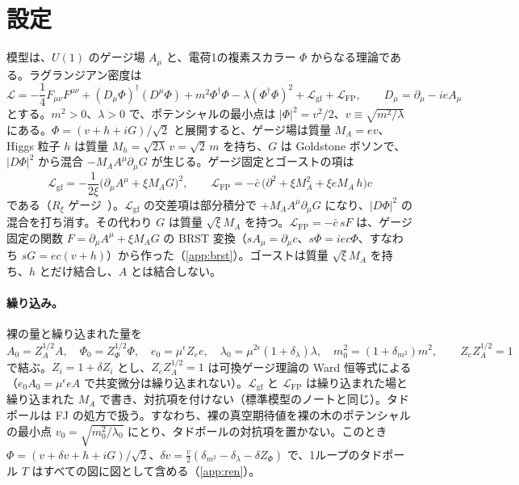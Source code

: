\documentclass[a4paper,10pt]{ltjsarticle}
\begin{document}
\section{設定}\label{sec:setup}

模型は、$U(1)$ のゲージ場 $A_\mu$ と、電荷1の複素スカラー $\Phi$ からなる理論である。ラグランジアン密度は
\begin{equation}
\mathcal L=-\frac14F_{\mu\nu}F^{\mu\nu}+(D_\mu\Phi)^\dagger(D^\mu\Phi)+m^2\Phi^\dagger\Phi-\lambda(\Phi^\dagger\Phi)^2+\mathcal L_{\mathrm{gf}}+\mathcal L_{\mathrm{FP}},\qquad
D_\mu=\partial_\mu-ieA_\mu
\label{eq:L}
\end{equation}
とする。$m^2>0$、$\lambda>0$ で、ポテンシャルの最小点は $|\Phi|^2=v^2/2$、$v\equiv\sqrt{m^2/\lambda}$ にある。$\Phi=(v+h+iG)/\sqrt2$ と展開すると、ゲージ場は質量 $M_A=ev$、Higgs 粒子 $h$ は質量 $M_h=\sqrt{2\lambda}\,v=\sqrt2\,m$ を持ち、$G$ は Goldstone ボソンで、$|D\Phi|^2$ から混合 $-M_AA^\mu\partial_\mu G$ が生じる。ゲージ固定とゴーストの項は
\begin{equation}
\mathcal L_{\mathrm{gf}}=-\frac1{2\xi}\bigl(\partial_\mu A^\mu+\xi M_AG\bigr)^2,\qquad
\mathcal L_{\mathrm{FP}}=-\bar c\,\bigl(\partial^2+\xi M_A^2+\xi eM_A\,h\bigr)c
\label{eq:gf}
\end{equation}
である（$R_\xi$ ゲージ~\cite{fls72}）。$\mathcal L_{\mathrm{gf}}$ の交差項は部分積分で $+M_AA^\mu\partial_\mu G$ になり、$|D\Phi|^2$ の混合を打ち消す。その代わり $G$ は質量 $\sqrt\xi M_A$ を持つ。$\mathcal L_{\mathrm{FP}}=-\bar c\,sF$ は、ゲージ固定の関数 $F=\partial_\mu A^\mu+\xi M_AG$ の BRST 変換（$sA_\mu=\partial_\mu c$、$s\Phi=iec\Phi$、すなわち $sG=ec(v+h)$）から作った（\ref{app:brst}）。ゴーストは質量 $\sqrt\xi M_A$ を持ち、$h$ とだけ結合し、$A$ とは結合しない。

\paragraph{繰り込み。}裸の量と繰り込まれた量を
\begin{equation}
A_0=Z_A^{1/2}A,\quad \Phi_0=Z_\Phi^{1/2}\Phi,\quad e_0=\mu^\epsilon Z_ee,\quad \lambda_0=\mu^{2\epsilon}(1+\delta_\lambda)\lambda,\quad m_0^2=(1+\delta_{m^2})m^2,\qquad Z_eZ_A^{1/2}=1
\label{eq:bare}
\end{equation}
で結ぶ。$Z_i=1+\delta Z_i$ とし、$Z_eZ_A^{1/2}=1$ は可換ゲージ理論の Ward 恒等式による（$e_0A_0=\mu^\epsilon eA$ で共変微分は繰り込まれない）。$\mathcal L_{\mathrm{gf}}$ と $\mathcal L_{\mathrm{FP}}$ は繰り込まれた場と繰り込まれた $M_A$ で書き、対抗項を付けない（標準模型のノートと同じ）。タドポールは FJ の処方で扱う。すなわち、裸の真空期待値を裸の木のポテンシャルの最小点 $v_0=\sqrt{m_0^2/\lambda_0}$ にとり、タドポールの対抗項を置かない。このとき $\Phi=(v+\delta v+h+iG)/\sqrt2$、$\delta v=\frac v2(\delta_{m^2}-\delta_\lambda-\delta Z_\Phi)$ で、1ループのタドポール $T$ はすべての図に図として含める（\ref{app:ren}）。
\end{document}
